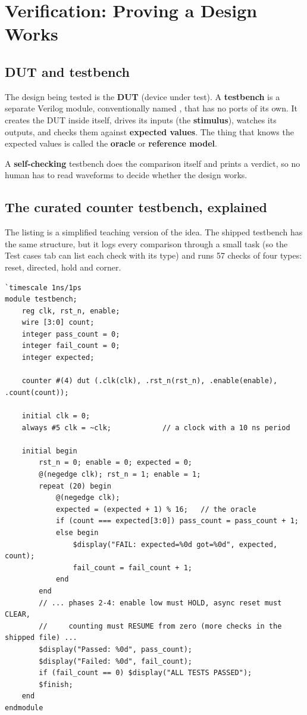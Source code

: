 \chapter{Verification: Proving a Design Works}
\label{ch:verification}

\section{DUT and testbench}

The design being tested is the \textbf{DUT} (device under test). A \textbf{testbench} is a separate Verilog module, conventionally named , that has no ports of its own. It creates the DUT inside itself, drives its inputs (the \textbf{stimulus}), watches its outputs, and checks them against \textbf{expected values}. The thing that knows the expected values is called the \textbf{oracle} or \textbf{reference model}.

A \textbf{self-checking} testbench does the comparison itself and prints a verdict, so no human has to read waveforms to decide whether the design works.

\section{The curated counter testbench, explained}

The listing is a simplified teaching version of the idea. The shipped testbench has the same structure, but it logs every comparison through a small  task (so the Test cases tab can list each check with its type) and runs 57 checks of four types: reset, directed, hold and corner.

\begin{lstlisting}
`timescale 1ns/1ps
module testbench;
    reg clk, rst_n, enable;
    wire [3:0] count;
    integer pass_count = 0;
    integer fail_count = 0;
    integer expected;

    counter #(4) dut (.clk(clk), .rst_n(rst_n), .enable(enable), .count(count));

    initial clk = 0;
    always #5 clk = ~clk;            // a clock with a 10 ns period

    initial begin
        rst_n = 0; enable = 0; expected = 0;
        @(negedge clk); rst_n = 1; enable = 1;
        repeat (20) begin
            @(negedge clk);
            expected = (expected + 1) % 16;   // the oracle
            if (count === expected[3:0]) pass_count = pass_count + 1;
            else begin
                $display("FAIL: expected=%0d got=%0d", expected, count);
                fail_count = fail_count + 1;
            end
        end
        // ... phases 2-4: enable low must HOLD, async reset must CLEAR,
        //     counting must RESUME from zero (more checks in the shipped file) ...
        $display("Passed: %0d", pass_count);
        $display("Failed: %0d", fail_count);
        if (fail_count == 0) $display("ALL TESTS PASSED");
        $finish;
    end
endmodule
\end{lstlisting}

